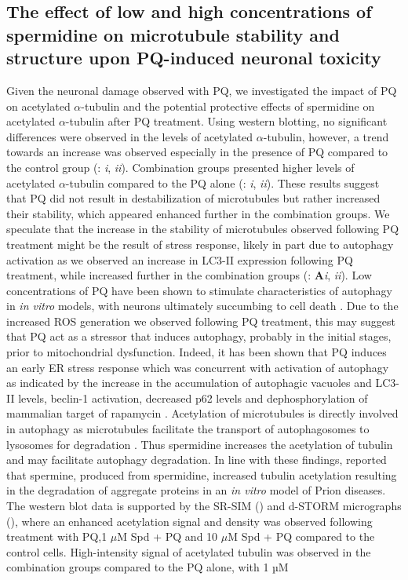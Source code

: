 \subsection{ The effect of low and high concentrations of spermidine on microtubule stability and structure upon PQ-induced neuronal toxicity}
Given the neuronal damage observed with PQ, we investigated the impact of PQ on acetylated $\alpha$-tubulin and the potential protective effects of spermidine on acetylated $\alpha$-tubulin after PQ treatment. Using western blotting, no significant differences were observed in the levels of acetylated $\alpha$-tubulin, however, a trend towards an increase was observed especially in the presence of PQ compared to the control group (: \textit{i}, \textit{ii}). Combination groups presented higher levels of acetylated $\alpha$-tubulin compared to the PQ alone (: \textit{i}, \textit{ii}). These results suggest that PQ did not result in destabilization of microtubules but rather increased their stability, which appeared enhanced further in the combination groups. We speculate that the increase in the stability of microtubules observed following PQ treatment might be the result of stress response, likely in part due to autophagy activation as we observed an increase in LC3-II expression following PQ treatment, while increased further in the combination groups (: \textbf{A}\textit{i}, \textit{ii}). Low concentrations of PQ have been shown to stimulate characteristics of autophagy in \textit{in vitro} models, with neurons ultimately succumbing to cell death \citep{Gonzalez-Polo2009,Gonzalez-Polo2007a,Gonzalez-Polo2007b,Niso-Santano2006}. Due to the increased ROS generation we observed following PQ treatment, this may suggest that PQ act as a stressor that induces autophagy, probably in the initial stages, prior to mitochondrial dysfunction. Indeed, it has been shown that PQ induces an early ER stress response which was concurrent with activation of autophagy as indicated by the increase in the accumulation of autophagic vacuoles and LC3-II levels, beclin-1 activation, decreased p62 levels and dephosphorylation of  mammalian target of rapamycin \citep{Gonzalez-Polo2007a,Gonzalez-Polo2007b,Niso-Santano2011}. Acetylation of microtubules is directly involved in autophagy as microtubules facilitate the transport of autophagosomes to lysosomes for degradation \citep{Phadwal2018,Xie2010}. Thus spermidine increases the acetylation of tubulin and may facilitate autophagy degradation. In line with these findings, \citet{Phadwal2018} reported that spermine, produced from spermidine, increased tubulin acetylation resulting in the degradation of aggregate proteins in an \textit{in vitro} model of Prion diseases. The western blot data is supported by the SR-SIM () and d-STORM micrographs (), where an enhanced acetylation signal and density was observed following treatment with PQ,1 $\mu$M Spd + PQ and 10 $\mu$M Spd + PQ compared to the control cells. High-intensity signal of acetylated tubulin was observed in the combination groups compared to the PQ alone, with 1 µM 